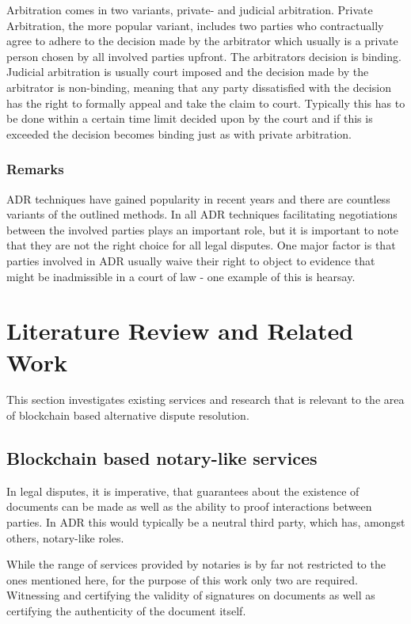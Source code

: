 \documentclass[12pt,msc,a4paper,oneside]{ucl_thesis}
\begin{document}
Arbitration comes in two variants, private- and judicial arbitration. Private Arbitration, the more popular variant, includes two parties who contractually agree to adhere to the decision made by the arbitrator which usually is a private person chosen by all involved parties upfront. The arbitrators decision is binding. Judicial arbitration is usually court imposed and the decision made by the arbitrator is non-binding, meaning that any party dissatisfied with the decision has the right to formally appeal and take the claim to court. Typically this has to be done within a certain time limit decided upon by the court and if this is exceeded the decision becomes binding just as with private arbitration.

\subsubsection{Remarks}
ADR techniques have gained popularity in recent years and there are countless variants of the outlined methods. In all ADR techniques facilitating negotiations between the involved parties plays an important role, but it is important to note that they are not the right choice for all legal disputes. One major factor is that parties involved in ADR usually waive their right to object to evidence that might be inadmissible in a court of law - one example of this is hearsay.

\section{Literature Review and Related Work} \label{sec:literature_review}
This section investigates existing services and research that is relevant to the area of blockchain based alternative dispute resolution.

\subsection{Blockchain based notary-like services}
In legal disputes, it is imperative, that guarantees about the existence of documents can be made as well as the ability to proof interactions between parties. In ADR this would typically be a neutral third party, which has, amongst others, notary-like roles.

While the range of services provided by notaries is by far not restricted to the ones mentioned here, for the purpose of this work only two are required. Witnessing and certifying the validity of signatures on documents as well as certifying the authenticity of the document itself. \cite{notary:does_blockchain_notary_work}
\end{document}
